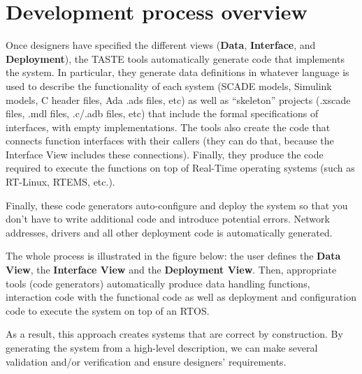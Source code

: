 \documentclass[11pt]{book}
\newcommand{\Concept}[1]{#1\xspace}
\newcommand{\taste}{\Concept{TASTE}}
\begin{document}
   \section{Development process overview}
   Once designers have specified the different views (\textbf{Data}, \textbf{Interface},
   and \textbf{Deployment}), the \taste tools automatically generate code
   that implements the system. In particular, they generate data definitions in 
   whatever language is used to describe the functionality of each system
   (SCADE models, Simulink models, C header files, Ada .ads files, etc) as well
   as ``skeleton'' projects (.xscade files, .mdl files, .c/.adb files, etc)
   that include the formal specifications of interfaces, with empty implementations.
   The tools also create the code that connects function interfaces with their callers
   (they can do that, because the Interface View includes these connections).
   Finally, they produce the code required to execute the functions on top of 
   Real-Time operating systems (such as RT-Linux, RTEMS, etc.).

   Finally, these code generators auto-configure and deploy the system so that
   you don't have to write additional code and introduce potential errors.
   Network addresses, drivers and all other deployment code is automatically
   generated.

   The whole process is illustrated in the figure below: the user defines the
   \textbf{Data View}, the \textbf{Interface View} and the \textbf{Deployment
   View}. Then, appropriate tools (code generators) automatically produce data
   handling functions, interaction code with the functional code as well as
   deployment and configuration code to execute the system on top of an RTOS.

   \centerline{}

   As a result, this approach creates systems that are correct by construction.
   By generating the system from a high-level description, we can make several
   validation and/or verification and ensure designers' requirements.
\end{document}
